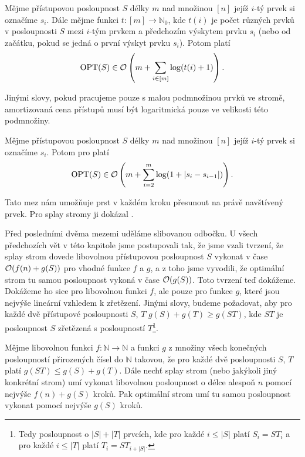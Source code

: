 \begin{veta}

Mějme přístupovou posloupnost $S$ délky $m$ nad množinou $[n]$ jejíž $i$-tý prvek si označíme $s_i$. Dále mějme funkci $t: [m]\rightarrow \mathbb N_0$, kde $t(i)$ je počet různých prvků v posloupnosti $S$ mezi $i$-tým prvkem a předchozím výskytem prvku $s_i$ (nebo od začátku, pokud se jedná o první výskyt prvku $s_i$). Potom platí $$\operatorname{OPT}(S) \in \mathcal O\left(m + \sum_{i\in [m]}\log (t(i)+1) \right).$$
\end{veta}

Jinými slovy, pokud pracujeme pouze s malou podmnožinou prvků ve stromě, amortizovaná cena přístupů musí být logaritmická pouze ve velikosti této podmnožiny.

\begin{veta}
Mějme přístupovou posloupnost $S$ délky $m$ nad množinou $[n]$ jejíž $i$-tý prvek si označíme $s_i$. Potom pro platí $$\operatorname{OPT}(S) \in \mathcal O\left(m + \sum_{i=2}^m \log(1 + |s_{i}-s_{i-1}|) \right).$$
\end{veta}

Tato mez nám umožňuje prst v každém kroku přesunout na právě navštívený prvek. Pro splay stromy ji dokázal \citet{dynamicfinger}.

Před posledními dvěma mezemi uděláme slibovanou odbočku. U všech předchozích
vět v této kapitole jsme postupovali tak, že jsme vzali tvrzení, že splay strom
dovede libovolnou přístupovou posloupnost $S$ vykonat v čase $\mathcal O(f(n)+g(S))$
pro vhodné funkce $f$ a $g$, a z toho jsme vyvodili, že optimální strom tu
samou posloupnost vykoná v čase $\mathcal O(g(S))$. Toto tvrzení teď dokážeme. Dokážeme
ho sice pro libovolnou funkci $f$, ale pouze pro funkce $g$, které jsou nejvýše
lineární vzhledem k zřetězení. Jinými slovy, budeme požadovat, aby pro každé dvě přístupové posloupnosti $S$, $T$ $g(S) + g(T)\geq
g(ST)$, kde $ST$ je posloupnost $S$ zřetězená s posloupností $T$\footnote{Tedy
posloupnost o $|S|+|T|$ prvcích, kde pro každé $i\leq |S|$ platí $S_i = ST_i$ a pro každé $i\leq|T|$ platí $T_i = ST_{i+|S|}$.}.

\begin{tvrz}\label{tvrz:konstantypryc}
Mějme libovolnou funkci $f:\mathbb N \rightarrow \mathbb N$ a funkci $g$ z množiny všech konečných posloupností přirozených čísel do $\mathbb N$ 
takovou, že pro každé dvě posloupnosti $S$, $T$ platí $g(ST)\leq g(S)+g(T)$. Dále nechť splay strom (nebo jakýkoli jiný
konkrétní strom) umí vykonat libovolnou posloupnost o délce alespoň $n$ pomocí nejvýše
$f(n) + g(S)$ kroků. Pak optimální strom umí tu samou posloupnost vykonat pomocí nejvýše $g(S)$ kroků.
\end{tvrz}

